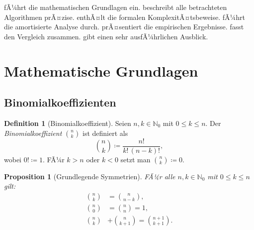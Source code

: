 ﻿\documentclass[12pt, a4paper]{article}
\newcommand{\myN}{\mathbb{N}}
\theoremstyle{plain}
\newtheorem{proposition}[theorem]{Proposition}
\theoremstyle{definition}
\newtheorem{definition}[theorem]{Definition}
\theoremstyle{remark}
\begin{document}
 fÃ¼hrt die mathematischen Grundlagen ein.
 beschreibt alle betrachteten Algorithmen
prÃ¤zise.  enthÃ¤lt die formalen
KomplexitÃ¤tsbeweise.  fÃ¼hrt die amortisierte
Analyse durch.  prÃ¤sentiert die empirischen
Ergebnisse.  fasst den Vergleich zusammen.
 gibt einen sehr ausfÃ¼hrlichen Ausblick.


\section{Mathematische Grundlagen}
\label{sec:grundlagen}

\subsection{Binomialkoeffizienten}

\begin{definition}[Binomialkoeffizient]
  \label{def:binom}
  Seien $n, k \in \myN_0$ mit $0 \le k \le n$. Der
  \emph{Binomialkoeffizient} $\binom{n}{k}$ ist definiert als
  \begin{equation}
    \binom{n}{k} \coloneqq \frac{n!}{k!\,(n-k)!},
    \label{eq:binom_def}
  \end{equation}
  wobei $0! \coloneqq 1$. FÃ¼r $k > n$ oder $k < 0$ setzt man
  $\binom{n}{k} \coloneqq 0$.
\end{definition}

\begin{proposition}[Grundlegende Symmetrien]
  \label{prop:symmetrie}
  FÃ¼r alle $n, k \in \myN_0$ mit $0 \le k \le n$ gilt:
  \begin{align}
    \binom{n}{k} &= \binom{n}{n-k}, \label{eq:sym1}\\
    \binom{n}{0} &= \binom{n}{n} = 1, \label{eq:sym2}\\
    \binom{n}{k} &+ \binom{n}{k+1} = \binom{n+1}{k+1}. \label{eq:sym3}
  \end{align}
\end{proposition}
\end{document}
